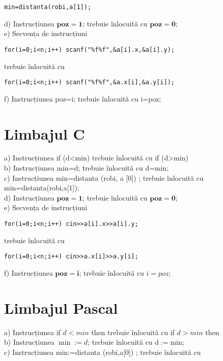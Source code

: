 \begin{verbatim}
min=distanta(robi,a[1]);
\end{verbatim}

d) Instrucțiunea $\mathbf{p o z = 1}$; trebuie înlocuită cu $\mathbf{p o z = 0 ; ~}$\\
e) Secvența de instrucțiuni

\begin{verbatim}
for(i=0;i<n;i++) scanf("%f%f",&a[i].x,&a[i].y);
\end{verbatim}

trebuie înlocuită cu

\begin{verbatim}
for(i=0;i<n;i++) scanf("%f%f",&a.x[i],&a.y[i]);
\end{verbatim}

f) Instrucțiunea poz=i; trebuie înlocuită cu i=poz;

\section*{Limbajul C}
a) Instrucțiunea if (d<min) trebuie înlocuită cu if (d>min)\\
b) Instrucțiunea min=d; trebuie înlocuită cu d=min;\\[0pt]
c) Instrucțiunea min=distanta (robi, a [0]) ; trebuie înlocuită cu min=distanta(robi,a[1]);\\
d) Instrucțiunea $\mathbf{p o z = 1}$; trebuie înlocuită cu $\mathbf{p o z = 0 ; ~}$\\
e) Secvența de instrucțiuni

\begin{verbatim}
for(i=0;i<n;i++) cin>>a[i].x>>a[i].y;
\end{verbatim}

trebuie înlocuită cu

\begin{verbatim}
for(i=0;i<n;i++) cin>>a.x[i]>>a.y[i];
\end{verbatim}

f) Instrucțiunea $\mathbf{p o z = i}$; trebuie înlocuită cu $i=p o z$;

\section*{Limbajul Pascal}
a) Instrucțiunea if $d<m i n$ then trebuie înlocuită cu if $d>m i n$ then\\
b) Instrucțiunea $\min :=d$; trebuie înlocuită cu $\mathrm{d}:=\mathrm{min}$;\\[0pt]
c) Instrucțiunea min:=distanta (robi,a[0]) ; trebuie înlocuită cu

